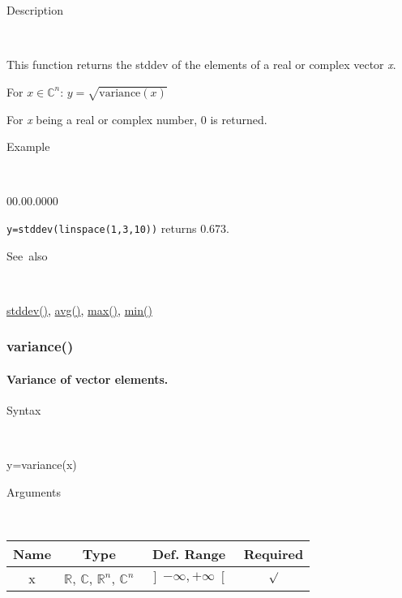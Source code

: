 \begin{description}
\item [Description]~
\end{description}
This function returns the stddev of the elements of a real or complex
vector \textit{x}.

\medskip{}
For $x\in$$\mathbb{C}^{n}$: $y=$$\sqrt{\textrm{variance}(x)}$
\medskip{}

\noindent For \textit{x} being a real or complex number, 0 is returned.

\begin{description}
\item [Example]~
\end{description}
\begin{lyxlist}{00.00.0000}
\item [\texttt{y=stddev(linspace(1,3,10))}]returns 0.673.
\end{lyxlist}
\begin{description}
\item [See~also]~
\end{description}
\textcolor{blue}{\hyperlink{stddev}{stddev()}}\textcolor{black}{,}
\textcolor{blue}{\hyperlink{avg}{avg()}}\textcolor{black}{,} \textcolor{blue}{\hyperlink{max}{max()}}\textcolor{black}{,}
\textcolor{blue}{\hyperlink{min}{min()}}


\newpage
\subsubsection*{\hypertarget{variance}{}{\Large variance()}}


\paragraph{\label{par:Variance}Variance of vector elements.}

\begin{description}
\item [Syntax]~
\end{description}
y=variance(x)

\begin{description}
\item [Arguments]~
\end{description}
\begin{tabular}{|c|c|c|c|}
\hline 
Name&
Type&
Def. Range&
Required\tabularnewline
\hline
\hline 
x&
$\mathbb{R}$, $\mathbb{C}$, $\mathbb{R}^{n}$, $\mathbb{C}^{n}$&
$\left]-\infty,+\infty\right[$&
$\surd$\tabularnewline
\hline
\end{tabular}

